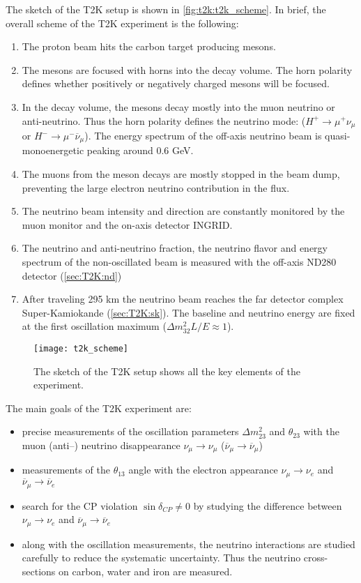\documentclass[../main.tex]{subfiles}
\begin{document}
The sketch of the T2K setup is shown in \autoref{fig:t2k:t2k_scheme}. In brief, the overall scheme of the T2K experiment is the following:
\begin{enumerate}
  \item The proton beam hits the carbon target producing mesons.
  \item The mesons are focused with horns into the decay volume. The horn polarity defines whether positively or negatively charged mesons will be focused.
  \item In the decay volume, the mesons decay mostly into the muon neutrino or anti-neutrino. Thus the horn polarity defines the neutrino mode: ($H^+\to\mu^+\nu_{\mu}$ or $H^-\to\mu^-\overline{\nu}_{\mu}$). The energy spectrum of the off-axis neutrino beam is quasi-monoenergetic peaking around 0.6 GeV.
  \item The muons from the meson decays are mostly stopped in the beam dump, preventing the large electron neutrino contribution in the flux.
  \item The neutrino beam intensity and direction are constantly monitored by the muon monitor and the on-axis detector INGRID.
  \item The neutrino and anti-neutrino fraction, the neutrino flavor and energy spectrum of the non-oscillated beam is measured with the off-axis ND280 detector (\autoref{sec:T2K:nd})
  \item After traveling 295 km the neutrino beam reaches the far detector complex Super-Kamiokande (\autoref{sec:T2K:sk}). The baseline and neutrino energy are fixed at the first oscillation maximum ($\Delta m ^2_{32}L/E\approx1$).
\end{enumerate}

\begin{figure}[!ht]
  \centering
  \texttt{[image: t2k\_scheme]}
  \caption{The sketch of the T2K setup shows all the key elements of the experiment.}
  \label{fig:t2k:t2k_scheme}
\end{figure}

The main goals of the T2K experiment are:
\begin{itemize}
  \item precise measurements of the oscillation parameters $\Delta m^2_{23}$ and $\theta_{23}$ with the muon (anti--) neutrino disappearance $\nu_\mu\to\nu_\mu$ ($\overline{\nu}_\mu\to\overline{\nu}_\mu$)
  \item measurements of the  $\theta_{13}$ angle with the electron appearance $\nu_\mu\to\nu_e$ and $\overline{\nu}_\mu\to\overline{\nu}_e$
  \item search for the CP violation $\sin\delta_{CP}\neq0$ by studying the difference between $\nu_\mu\to\nu_e$ and $\overline{\nu}_\mu\to\overline{\nu}_e$
  \item along with the oscillation measurements, the neutrino interactions are studied carefully to reduce the systematic uncertainty. Thus the neutrino cross-sections on carbon, water and iron are measured.
\end{itemize}
\end{document}
